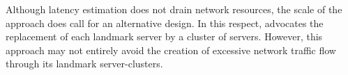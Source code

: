 Although latency estimation does not drain network resources,
the scale of the approach does call for an alternative design.
In this respect, \cite{RHMKS2002} advocates the replacement of 
each landmark server by a cluster of servers.
However, this approach may not entirely avoid the creation of 
excessive network traffic flow through its landmark server-clusters.
%
%
%
%
%
